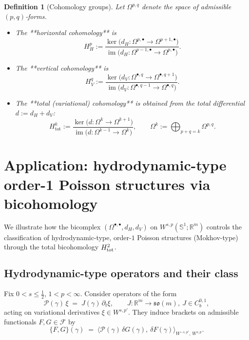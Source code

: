 \documentclass{amsart}
\newcounter{thm}
\newcounter{ex}
\newcounter{re}
\newtheorem{definition}[thm]{Definition}
\begin{document}
\begin{definition}[Cohomology groups]\label{def:cohomology}
Let $\Omega^{p,q}$ denote the space of admissible $(p,q)$‑forms.
\begin{itemize}
  \item The **horizontal cohomology** is
    \[
      H^{p}_{H}
        :=\frac{\ker\bigl(d_{H}:\Omega^{p,\bullet}\to\Omega^{p+1,\bullet}\bigr)}
               {\operatorname{im}\bigl(d_{H}:\Omega^{p-1,\bullet}\to\Omega^{p,\bullet}\bigr)} .
    \]
  \item The **vertical cohomology** is
    \[
      H^{q}_{V}
        :=\frac{\ker\bigl(d_{V}:\Omega^{\bullet,q}\to\Omega^{\bullet,q+1}\bigr)}
               {\operatorname{im}\bigl(d_{V}:\Omega^{\bullet,q-1}\to\Omega^{\bullet,q}\bigr)} .
    \]
  \item The **total (variational) cohomology** is obtained from the total
    differential $d:=d_{H}+d_{V}$:
    \[
      H^{k}_{\mathrm{tot}}
        :=\frac{\ker\bigl(d:\Omega^{k}\to\Omega^{k+1}\bigr)}
               {\operatorname{im}\bigl(d:\Omega^{k-1}\to\Omega^{k}\bigr)},
      \qquad
      \Omega^{k}:=\bigoplus_{p+q=k}\Omega^{p,q}.
    \]
\end{itemize}
\end{definition}



\section{Application: hydrodynamic-type order-1 Poisson structures via bicohomology}

We illustrate how the bicomplex $(\Omega^{\bullet,\bullet},d_H,d_V)$ on
$W^{s,p}(\mathbb S^1;\mathbb R^m)$ controls the classification of
hydrodynamic-type, order-$1$ Poisson structures (Mokhov-type) through
the total bicohomology $H^2_{\rm tot}$.

\subsection{Hydrodynamic-type operators and their class}

Fix $0<s\le\tfrac12$, $1<p<\infty$.
Consider operators of the form
\begin{equation}\label{eq:hydro-operator}
\mathcal P(\gamma)\,\xi \;=\; J(\gamma)\,\partial_t\xi,
\qquad J:\mathbb R^m\to\mathfrak{so}(m),\ J\in C^{0,1}_b,
\end{equation}
acting on variational derivatives $\xi\in W^{s,p'}$.
They induce brackets on admissible functionals $F,G\in\mathcal F$ by
\[
\{F,G\}(\gamma)\;=\;\big\langle \mathcal P(\gamma)\,\delta G(\gamma),\ \delta F(\gamma)\big\rangle_{W^{-s,p'},\,W^{s,p}}.
\]
\end{document}

